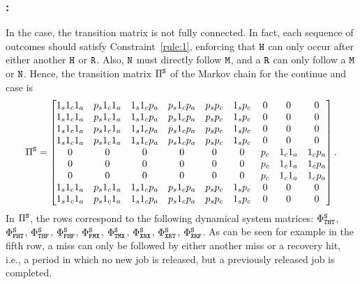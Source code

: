 \subsubsection*{\tS{}:}
In the \tS{} case, the transition matrix is not fully connected.
In fact, each sequence of outcomes should satisfy Constraint~\ref{rule:1}, enforcing that $\texttt{H}$ can only occur after either another $\texttt{H}$ or $\texttt{R}$.
Also, $\texttt{N}$ must directly follow $\texttt{M}$, and a $\texttt{R}$ can only follow a $\texttt{M}$ or $\texttt{N}$.
Hence, the transition matrix $\Pi^{\texttt{S}}$ of the Markov chain for the continue and \tS{} case is
{\small
\begin{equation}
\label{eq:piskip}
\Pi^{\Skip} = \begin{bmatrix}
            1_s1_c1_a & p_s1_c1_a & 1_s1_cp_a & p_s1_cp_a & p_sp_c & 1_sp_c & 0 & 0 & 0 \\
            1_s1_c1_a & p_s1_c1_a & 1_s1_cp_a & p_s1_cp_a & p_sp_c & 1_sp_c & 0 & 0 & 0 \\
            1_s1_c1_a & p_s1_c1_a & 1_s1_cp_a & p_s1_cp_a & p_sp_c & 1_sp_c & 0 & 0 & 0 \\
            1_s1_c1_a & p_s1_c1_a & 1_s1_cp_a & p_s1_cp_a & p_sp_c & 1_sp_c & 0 & 0 & 0 \\
            0 & 0 & 0 & 0 & 0 & 0 & p_c & 1_c1_a & 1_cp_a \\
            0 & 0 & 0 & 0 & 0 & 0 & p_c & 1_c1_a & 1_cp_a \\
            0 & 0 & 0 & 0 & 0 & 0 & p_c & 1_c1_a & 1_cp_a \\
            1_s1_c1_a & p_s1_c1_a & 1_s1_cp_a & p_s1_cp_a & p_sp_c & 1_sp_c & 0 & 0 & 0 \\
            1_s1_c1_a & p_s1_c1_a & 1_s1_cp_a & p_s1_cp_a & p_sp_c & 1_sp_c & 0 & 0 & 0 \\
\end{bmatrix}.
\end{equation}
}
In $\Pi^{\texttt{S}}$, the rows correspond to the following dynamical system matrices: $\Phi^{\texttt{S}}_{\texttt{T}\texttt{H}\texttt{T}}$, $\Phi^{\texttt{S}}_{\texttt{F}\texttt{H}\texttt{T}}$, $\Phi^{\texttt{S}}_{\texttt{T}\texttt{H}\texttt{F}}$, $\Phi^{\texttt{S}}_{\texttt{F}\texttt{H}\texttt{F}}$, $\Phi^{\texttt{S}}_{\texttt{F}\texttt{M}\texttt{X}}$, $\Phi^{\texttt{S}}_{\texttt{T}\texttt{M}\texttt{X}}$, $\Phi^{\texttt{S}}_{\texttt{X}\texttt{N}\texttt{X}}$, $\Phi^{\texttt{S}}_{\texttt{X}\texttt{R}\texttt{T}}$, $\Phi^{\texttt{S}}_{\texttt{X}\texttt{R}\texttt{F}}$.
As can be seen for example in the fifth row, a miss can only be followed by either another miss or a recovery hit, i.e., a period in which no new job is released, but a previously released job is completed.
 
